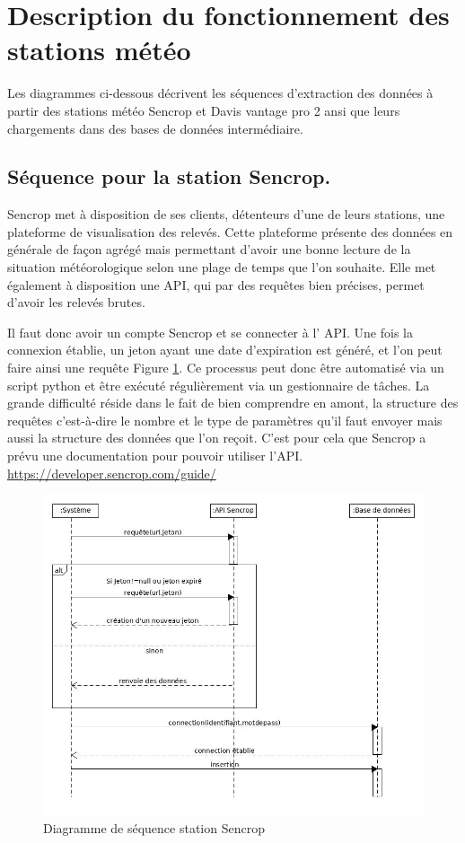 \section{Description du fonctionnement des stations météo}
 
Les diagrammes ci-dessous décrivent les séquences d’extraction des données à partir des stations météo Sencrop et Davis vantage pro 2 ansi que leurs chargements dans des bases de données intermédiaire.

\subsection{Séquence pour la station Sencrop.}
Sencrop met à disposition de ses clients, détenteurs d’une de leurs stations, une plateforme de visualisation des relevés. Cette plateforme présente des données en générale de façon agrégé mais permettant d’avoir une bonne lecture de la situation météorologique selon une plage de temps que l’on souhaite. Elle met également à disposition une API, qui par des requêtes bien précises, permet d’avoir les relevés brutes.  

Il faut donc avoir un compte Sencrop et se connecter à l’ \gls{API}. Une fois la connexion établie, un jeton ayant une date d’expiration est généré, et l’on peut faire ainsi une requête Figure \ref{fig : Diagramme de séquence station sencrop}. Ce processus peut donc être automatisé via un script python et être exécuté régulièrement via un gestionnaire de tâches. La grande difficulté réside dans le fait de bien comprendre en amont, la structure des requêtes c’est-à-dire le nombre et le type de paramètres qu’il faut envoyer mais aussi la structure des données que l’on reçoit. C’est pour cela que Sencrop a prévu une documentation pour pouvoir utiliser l’API. 
\newline
\url{https://developer.sencrop.com/guide/}  
\begin{figure}[!h]
    \centering
     \includegraphics[width=.7\textwidth]{images/sencrop_senquence_diagrame.jpg}
    \caption{Diagramme de séquence station Sencrop}
    \label{fig : Diagramme de séquence station sencrop}
  
\end{figure}

